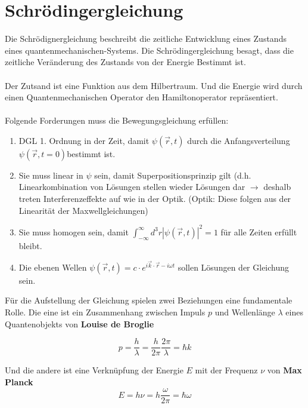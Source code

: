 




\section*{Schrödingergleichung}

Die Schrödignergleichung beschreibt die zeitliche Entwicklung eines Zustands eines quantenmechanischen-Systems. Die Schrödingergleichung besagt, dass die zeitliche Veränderung des Zustands von der Energie Bestimmt ist.\\
\\
Der Zutsand ist eine Funktion aus dem Hilbertraum. Und die Energie wird durch einen Quantenmechanischen Operator den Hamiltonoperator repräsentiert.\\
\\
Folgende Forderungen muss die Bewegungsgleichung erfüllen:
\begin{enumerate}
\item DGL 1. Ordnung in der Zeit, damit $\psi(\vec{r},t)$ durch die Anfangsverteilung
  $\psi(\vec{r},t=0)$bestimmt ist.
\item Sie muss linear in $\psi$ sein, damit Superpositionsprinzip gilt (d.h.
  Linearkombination von Lösungen stellen wieder Lösungen dar $\rightarrow$ deshalb
  treten Interferenzeffekte auf wie in der Optik. (Optik: Diese folgen
  aus der Linearität der Maxwellgleichungen)
\item Sie muss homogen sein, damit
  $\int_{-\infty}^{\infty}d^{3}r|\psi(\vec{r},t)|^{2}=1$ für
  alle Zeiten erfüllt bleibt.
\item Die ebenen Wellen \(\psi(\vec{r},t)=c\cdot  e^{i\vec{k}\cdot\vec{r}-i\omega t}\) sollen  Lösungen der Gleichung sein. 
\end{enumerate}

Für die Aufstellung der Gleichung spielen zwei Beziehungen eine fundamentale Rolle. Die eine ist ein Zusammenhang zwischen Impuls \(p\) und Wellenlänge \(\lambda\) eines Quantenobjekts von \textbf{Louise de Broglie}

\begin{equation}
  \label{eq:3}
  p = \frac{h}{\lambda} = \frac{h}{2\pi}\frac{2\pi}{\lambda} = \hbar k
\end{equation}

Und die andere ist eine Verknüpfung der Energie \(E\) mit der Frequenz \(\nu\) von \textbf{Max Planck}
\begin{equation}
  \label{eq:2}
  E=h\nu=h\frac{\omega}{2\pi} =\hbar \omega
\end{equation}

